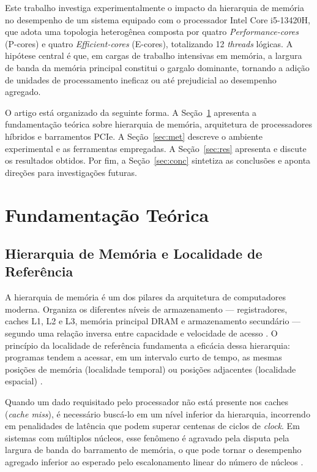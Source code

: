 \documentclass[12pt]{article}
\begin{document}
Este trabalho investiga experimentalmente o impacto da hierarquia de memória no desempenho de um sistema equipado com o processador Intel Core i5-13420H, que adota uma topologia heterogênea composta por quatro \textit{Performance-cores} (P-cores) e quatro \textit{Efficient-cores} (E-cores), totalizando 12 \textit{threads} lógicas. A hipótese central é que, em cargas de trabalho intensivas em memória, a largura de banda da memória principal constitui o gargalo dominante, tornando a adição de unidades de processamento ineficaz ou até prejudicial ao desempenho agregado.

O artigo está organizado da seguinte forma. A Seção~\ref{sec:fund} apresenta a fundamentação teórica sobre hierarquia de memória, arquitetura de processadores híbridos e barramentos PCIe. A Seção~\ref{sec:met} descreve o ambiente experimental e as ferramentas empregadas. A Seção~\ref{sec:res} apresenta e discute os resultados obtidos. Por fim, a Seção~\ref{sec:conc} sintetiza as conclusões e aponta direções para investigações futuras.

\section{Fundamentação Teórica}
\label{sec:fund}

\subsection{Hierarquia de Memória e Localidade de Referência}

A hierarquia de memória é um dos pilares da arquitetura de computadores moderna. Organiza os diferentes níveis de armazenamento — registradores, caches L1, L2 e L3, memória principal DRAM e armazenamento secundário — segundo uma relação inversa entre capacidade e velocidade de acesso \cite{patterson2021}. O princípio da localidade de referência fundamenta a eficácia dessa hierarquia: programas tendem a acessar, em um intervalo curto de tempo, as mesmas posições de memória (localidade temporal) ou posições adjacentes (localidade espacial) \cite{hennessy2017}.

Quando um dado requisitado pelo processador não está presente nos caches (\textit{cache miss}), é necessário buscá-lo em um nível inferior da hierarquia, incorrendo em penalidades de latência que podem superar centenas de ciclos de \textit{clock}. Em sistemas com múltiplos núcleos, esse fenômeno é agravado pela disputa pela largura de banda do barramento de memória, o que pode tornar o desempenho agregado inferior ao esperado pelo escalonamento linear do número de núcleos \cite{mccalpin1995}.
\end{document}
